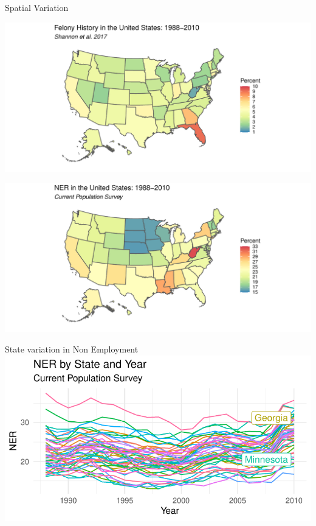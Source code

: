 \documentclass{beamer}\usepackage[]{graphicx}\usepackage[]{color}
\makeatletter
\def\maxwidth{ %
  \ifdim\Gin@nat@width>\linewidth
    \linewidth
  \else
    \Gin@nat@width
  \fi
}
\newenvironment{knitrout}{}{} %
\makeatother
\begin{document}
\begin{frame}{Spatial Variation}




\begin{knitrout}
\color{fgcolor}
\includegraphics[width=\maxwidth]{figure/unnamed-chunk-5-1} 

\includegraphics[width=\maxwidth]{figure/unnamed-chunk-5-2} 

\end{knitrout}

\end{frame}

\begin{frame}{State variation in Non Employment}
\begin{knitrout}
\color{fgcolor}
\includegraphics[width=\maxwidth]{figure/unnamed-chunk-6-1} 

\end{knitrout}
\end{frame}
\end{document}
